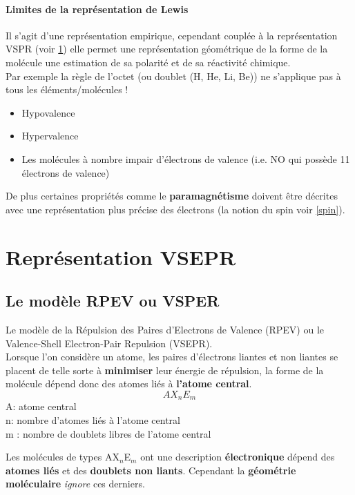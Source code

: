 \documentclass[10pt,a4paper]{book}
\begin{document}
\paragraph{Limites de la représentation de Lewis} Il s'agit d'une représentation empirique, cependant couplée à la représentation VSPR (voir \ref{VSPR}) elle permet une représentation géométrique de la forme de la molécule une estimation de sa polarité et de sa réactivité chimique. \\
Par exemple la règle de l’octet (ou doublet (H, He, Li, Be)) ne s’applique pas à tous les éléments/molécules !
\begin{itemize}
\item Hypovalence
\item Hypervalence
\item Les molécules à nombre impair d'électrons de valence (i.e. NO qui possède 11 électrons de valence)
\end{itemize}
De plus certaines propriétés comme le \textbf{paramagnétisme} doivent être décrites avec une représentation plus précise des électrons (la notion du spin voir \ref{spin}).

\section{Représentation VSEPR} \label{VSPR}
\subsection{Le modèle RPEV ou VSPER} Le modèle de la Répulsion des Paires d’Electrons de Valence (RPEV) ou le Valence-Shell Electron-Pair Repulsion (VSEPR). \\
Lorsque l'on considère un atome, les paires d’électrons liantes et non liantes se placent de telle sorte à \textbf{minimiser} leur énergie de répulsion, la forme de la molécule dépend donc des atomes liés à \textbf{l'atome central}.
\begin{displaymath}
AX_nE_m
\end{displaymath}
A: atome central \\
n: nombre d’atomes liés à l’atome central \\
m : nombre de doublets libres de l’atome central \par
Les molécules de types AX$_n$E$_m$ ont une description \textbf{électronique} dépend des \textbf{atomes liés} et des \textbf{doublets non liants}. Cependant la \textbf{géométrie moléculaire} \textit{ignore} ces derniers.
\end{document}
